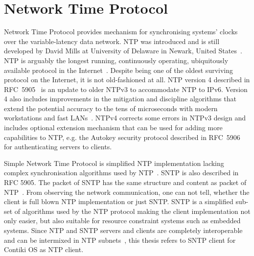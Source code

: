 
\chapter{Network Time Protocol}
Network Time Protocol provides mechanism for synchronising systems' clocks over the variable-latency data network.
NTP was introduced and is still developed by David Mills at University of Delaware in Newark, United States~\cite{ntp-history}.
NTP is arguably the longest running, continuously operating,
ubiquitously available protocol in the Internet~\cite{ntp-overview}.
Despite being one of the oldest surviving protocol on the Internet, it is not old-fashioned at all.
NTP version 4 described in RFC~5905~\cite{rfc5905} is an update to older NTPv3 to accommodate NTP to IPv6.
Version 4 also includes improvements in
the mitigation and discipline algorithms that extend
the potential accuracy to the tens of microseconds with modern
workstations and fast LANs~\cite{rfc5905}.
NTPv4 corrects some
errors in NTPv3 design and includes optional extension mechanism
that can be used for adding more capabilities to NTP, e.g. the
Autokey security protocol described in RFC~5906
for authenticating servers to clients.

Simple Network Time Protocol is simplified NTP implementation lacking complex
synchronisation algorithms used by NTP~\cite{rfc5905}.
SNTP is also described in RFC 5905.
The packet of SNTP has the same structure and content as packet of NTP~\cite{rfc5905}.
From observing the network communication, one can not tell, whether the client
is full blown NTP implementation or just SNTP.
SNTP is a simplified sub-set of algorithms used by the NTP protocol
making the client implementation not only easier, but also suitable for
resource constraint systems such as embedded systems.
Since NTP and SNTP servers and clients are
completely interoperable and can be intermixed in NTP subnets~\cite{rfc5905},
this thesis refers to SNTP client for Contiki OS as NTP client.









